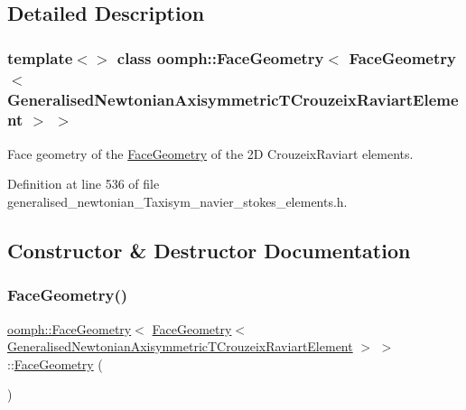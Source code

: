 \subsection{Detailed Description}
\subsubsection*{template$<$$>$\newline
class oomph\+::\+Face\+Geometry$<$ Face\+Geometry$<$ Generalised\+Newtonian\+Axisymmetric\+T\+Crouzeix\+Raviart\+Element $>$ $>$}

Face geometry of the \hyperlink{classoomph_1_1FaceGeometry}{Face\+Geometry} of the 2D Crouzeix\+Raviart elements. 

Definition at line 536 of file generalised\+\_\+newtonian\+\_\+\+Taxisym\+\_\+navier\+\_\+stokes\+\_\+elements.\+h.



\subsection{Constructor \& Destructor Documentation}
\mbox{\label{classoomph_1_1FaceGeometry_3_01FaceGeometry_3_01GeneralisedNewtonianAxisymmetricTCrouzeixRaviartElement_01_4_01_4_a65d8cb21f52472d6dfe23073bfc88843}} 
\subsubsection{\texorpdfstring{Face\+Geometry()}{FaceGeometry()}}
{\footnotesize\ttfamily \hyperlink{classoomph_1_1FaceGeometry}{oomph\+::\+Face\+Geometry}$<$ \hyperlink{classoomph_1_1FaceGeometry}{Face\+Geometry}$<$ \hyperlink{classoomph_1_1GeneralisedNewtonianAxisymmetricTCrouzeixRaviartElement}{Generalised\+Newtonian\+Axisymmetric\+T\+Crouzeix\+Raviart\+Element} $>$ $>$\+::\hyperlink{classoomph_1_1FaceGeometry}{Face\+Geometry} (\begin{DoxyParamCaption}{ }\end{DoxyParamCaption})\hspace{0.3cm}{\ttfamily [inline]}}



